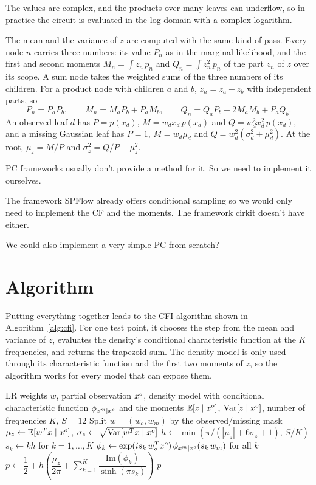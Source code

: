 The values are complex, and the products over many leaves can underflow, so in practice the circuit is
evaluated in the log domain with a complex logarithm.

The mean and the variance of $z$ are computed with the same kind of pass. Every node $n$ carries three numbers: its value $P_n$ as in the
marginal likelihood, and the first and second moments $M_n = \int z_n\, p_n$ and $Q_n = \int z_n^2\, p_n$ of the part $z_n$ of $z$ over its scope.
A sum node takes the weighted sums of the three numbers of its children. For a product node with children $a$ and $b$, $z_n = z_a + z_b$ with independent parts, so
\[
  P_n = P_a P_b, \qquad M_n = M_a P_b + P_a M_b, \qquad Q_n = Q_a P_b + 2 M_a M_b + P_a Q_b.
\]
An observed leaf $d$ has $P = p(x_d)$, $M = w_d x_d\, p(x_d)$ and $Q = w_d^2 x_d^2\, p(x_d)$, and a missing Gaussian leaf has $P = 1$, $M = w_d \mu_d$ and
$Q = w_d^2 (\sigma_d^2 + \mu_d^2)$. At the root, $\mu_z = M / P$ and $\sigma_z^2 = Q / P - \mu_z^2$.

PC frameworks usually don't provide a method for it. So we need to implement it ourselves.

The framework SPFlow already offers conditional sampling so we would only need to implement the CF and the moments.
The framework cirkit doesn't have either.

We could also implement a very simple PC from scratch?

\section{Algorithm}
\label{sec:algorithm}

Putting everything together leads to the CFI algorithm shown in Algorithm~\ref{alg:cfi}.
For one test point, it chooses the step from the mean and variance of $z$, evaluates the density's conditional
characteristic function at the $K$ frequencies, and returns the trapezoid sum. The density model is only used
through its characteristic function and the first two moments of $z$, so the algorithm works for every model that can expose them.

\begin{algorithm}[H]
\caption{CFI}
\label{alg:cfi}
\begin{algorithmic}[1]
\Require LR weights $w$, partial observation $x^o$, density model with conditional characteristic function $\phi_{x^m \mid x^o}$ and the moments $\mathbb{E}[z \mid x^o]$, $\mathrm{Var}[z \mid x^o]$, number of frequencies $K$, $S = 12$
\State Split $w = (w_o, w_m)$ by the observed/missing mask
\State $\mu_z \gets \mathbb{E}[w^T x \mid x^o]$, \quad $\sigma_z \gets \sqrt{\mathrm{Var}[w^T x \mid x^o]}$
\State $h \gets \min \left( \pi / (|\mu_z| + 6 \sigma_z + 1),\, S / K \right)$
\State $s_k \gets k h$ for $k = 1, \dots, K$
\State $\phi_k \gets \exp(i s_k\, w_o^T x^o)\, \phi_{x^m \mid x^o}(s_k\, w_m)$ for all $k$
\State $p \gets \dfrac{1}{2} + h \left( \dfrac{\mu_z}{2\pi} + \sum_{k=1}^{K} \dfrac{\mathrm{Im}(\phi_k)}{\sinh(\pi s_k)} \right)$
\State \Return $p$
\end{algorithmic}
\end{algorithm}


